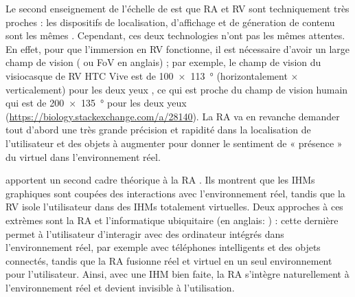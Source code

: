 Le second enseignement de l'échelle de \citeauthor{Milgram1994} est que RA et RV sont techniquement très proches : les dispositifs de localisation, d'affichage et de géneration de contenu sont les mêmes \citep{Billinghurst2015}. Cependant, ces deux technologies n'ont pas les mêmes attentes. En effet, pour que l'immersion en RV fonctionne, il est nécessaire d'avoir un large champ de vision ( ou FoV en anglais) ; par exemple, le champ de vision du visiocasque de RV HTC Vive est de \SI{100x113}{\degree} (horizontalement $\times$ verticalement) pour les deux yeux \citep{Kreylos2016}, ce qui est proche du champ de vision humain qui est de \SI{200x135}{\degree} pour les deux yeux (\url{https://biology.stackexchange.com/a/28140}). La RA va en revanche demander tout d'abord une très grande précision et rapidité dans la localisation de l'utilisateur et des objets à augmenter pour donner le sentiment de « présence » du virtuel dans l'environnement réel.


\cite{Rekimoto1995} apportent un second cadre théorique à la RA . Ils montrent que les IHMs graphiques sont coupées des interactions avec l'environnement réel, tandis que la RV isole l'utilisateur dans des IHMs totalement virtuelles. Deux approches à ces extrèmes sont la RA et l'informatique ubiquitaire (en anglais: ) : cette dernière permet à l'utilisateur d'interagir avec des ordinateur intégrés dans l'environnement réel, par exemple avec téléphones intelligents et des objets connectés, tandis que la RA fusionne réel et virtuel en un seul environnement pour l'utilisateur. Ainsi, avec une IHM bien faite, la RA s'intègre naturellement à l'environnement réel et devient invisible à l'utilisation.


